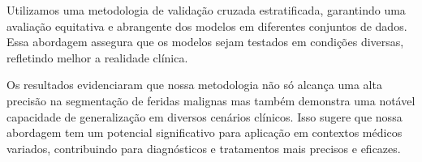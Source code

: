 Utilizamos uma metodologia de validação cruzada estratificada, garantindo uma avaliação equitativa e abrangente dos modelos em diferentes conjuntos de dados. Essa abordagem assegura que os modelos sejam testados em condições diversas, refletindo melhor a realidade clínica.

Os resultados evidenciaram que nossa metodologia não só alcança uma alta precisão na segmentação de feridas malignas mas também demonstra uma notável capacidade de generalização em diversos cenários clínicos. Isso sugere que nossa abordagem tem um potencial significativo para aplicação em contextos médicos variados, contribuindo para diagnósticos e tratamentos mais precisos e eficazes.
